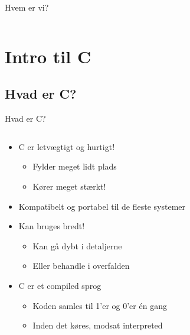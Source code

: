\documentclass{beamer}
\begin{document}
\begin{frame}{Hvem er vi?}
\begin{columns}
	\end{columns}
\end{frame}

\section{Intro til C}
\subsection{Hvad er C?}

\begin{frame}{Hvad er C?}
	\begin{columns}
	
		\begin{column}{0.5\textwidth}
		\begin{itemize}
		\item {C er letvægtigt og hurtigt!}
			\begin{itemize}
			\item{Fylder meget lidt plads}
			\item{Kører meget stærkt!}
			\end{itemize}
		\item {Kompatibelt og portabel til de fleste systemer}
		\item {Kan bruges bredt!}
			\begin{itemize}
			\item {Kan gå dybt i detaljerne}
			\item {Eller behandle i overfalden}
			\end{itemize}
		\item{C er et compiled sprog}
			\begin{itemize}
			\item {Koden samles til 1'er og 0'er én gang}
			\item {Inden det køres, modsat interpreted}
			\end{itemize}
		\end{itemize}
		\end{column}
		

\end{columns}
\end{frame}
\end{document}
